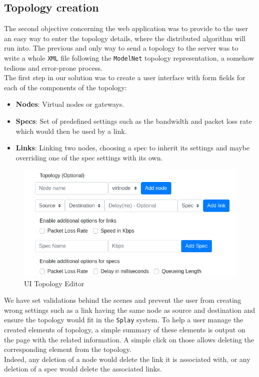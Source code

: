 \documentclass{eplmastersthesis}
\begin{document}
      \subsection{Topology creation}

        The second objective concerning the web application was to provide to the
        user an easy way to enter the topology details, where the distributed algorithm
        will run into. The previous and only way to send a topology
        to the server was to write a whole \texttt{XML} file following the \texttt{ModelNet}
        topology representation, a somehow tedious and error-prone process.\\

        The first step in our solution was to create a user interface with
        form fields for each of the components of the topology:

        \begin{itemize}
          \item \textbf{Nodes}: Virtual nodes or gateways.
          \item \textbf{Specs}: Set of predefined settings such as the
          bandwidth and packet loss rate which would then be used by
          a link.
          \item \textbf{Links}: Linking two nodes, choosing a spec to
          inherit its settings and maybe overriding one of the spec settings
          with its own.
        \end{itemize}

        \begin{figure}[H]
          \centering
          \includegraphics[scale=0.6]{figures/editor_topology.png}
          \caption{\label{editor_topology} UI Topology Editor}
        \end{figure}

        We have set validations behind the scenes and
        prevent the user from creating wrong settings such as a link having the
        same node as source and destination and ensure the topology would
        fit in the \texttt{Splay} system. To help a user manage the created
        elements of topology, a simple summary of these elements is
        output on the page with the related information. A simple click on those
        allows deleting the corresponding element from the topology.\\
        Indeed, any deletion of a node would delete the link it is associated
        with, or any deletion of a spec would delete the associated links.\\
\end{document}
